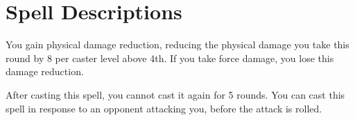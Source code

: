 \section{Spell Descriptions}

\small

\begin{comment}
\subsubsection{A}
\end{comment}

\begin{spellheader}
\end{spellheader}
\begin{spellcontent}
    \begin{spelltargetinginfo}
    \end{spelltargetinginfo}
    \begin{spelleffects}
        \spelleffect You gain physical damage reduction, reducing the physical damage you take this round by 8  per caster level above 4th. If you take force damage, you lose this damage reduction.
    \end{spelleffects}
\end{spellcontent}
\begin{spellfooter}
    \spellnotes After casting this spell, you cannot cast it again for 5 rounds. You can cast this spell in response to an opponent attacking you, before the attack is rolled.
\end{spellfooter}



